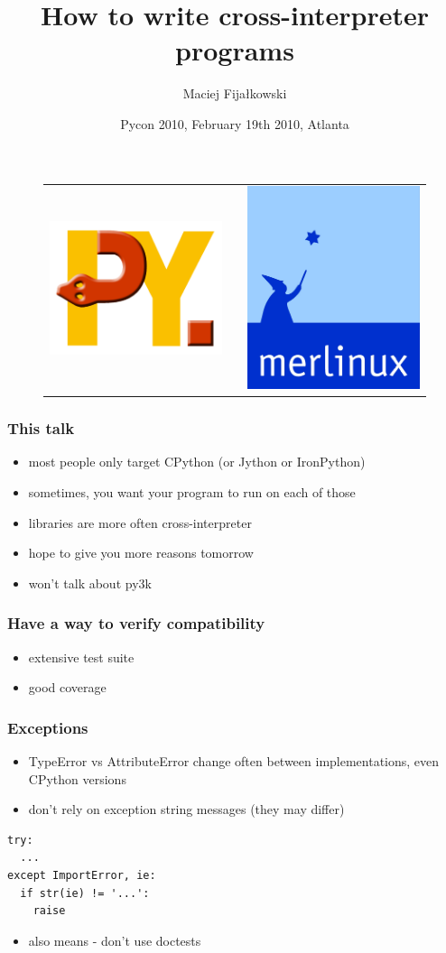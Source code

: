 \documentclass[utf8x, 14pt]{beamer}
\title{How to write cross-interpreter programs}
\author{Maciej Fijałkowski}
\institute[merlinux GmbH]
{ merlinux GmbH }
\date{Pycon 2010, February 19th 2010, Atlanta}
\begin{document}
\begin{frame}
  \titlepage
  \begin{figure}
    \begin{tabular}{c c c}
    \includegraphics[width=.20\textwidth]{../common/pypy-logo.png}
    &
    \hspace{2cm}
    &
    \includegraphics[width=.18\textwidth]{../common/merlinux-logo.png}
    \end{tabular}
  \end{figure}
\end{frame}

\begin{frame}
  \frametitle{This talk}
  \begin{itemize}
    \item most people only target CPython (or Jython or IronPython)
    \item sometimes, you want your program to run on each of those
    \item libraries are more often cross-interpreter
      \pause
    \item hope to give you more reasons tomorrow
      \pause
    \item won't talk about py3k
  \end{itemize}
\end{frame}

\begin{frame}
  \frametitle{Have a way to verify compatibility}
  \begin{itemize}
    \item extensive test suite
    \item good coverage
  \end{itemize}
\end{frame}

\begin{frame}[fragile]
  \frametitle{Exceptions}
  \begin{itemize}
    \item TypeError vs AttributeError change often between implementations,
      even CPython versions
    \item don't rely on exception string messages (they may differ)
  \end{itemize}
  \begin{verbatim}
try:
  ...
except ImportError, ie:
  if str(ie) != '...':
    raise
  \end{verbatim}
  \pause
  \begin{itemize}
    \item also means - don't use doctests
  \end{itemize}
\end{frame}
\end{document}
